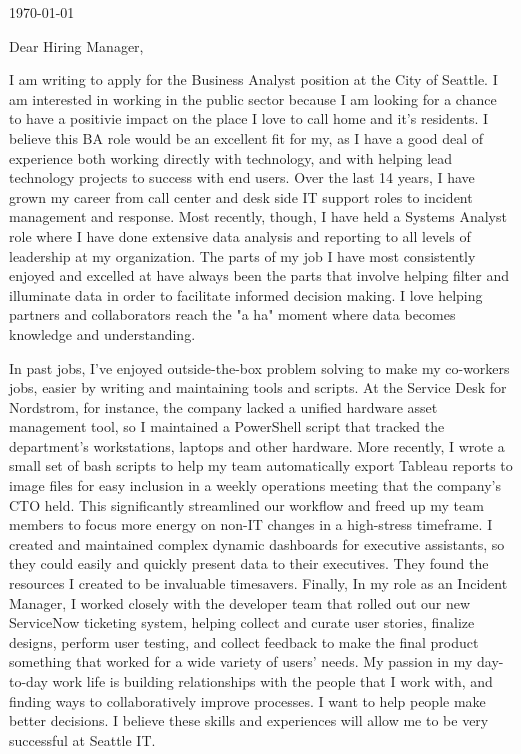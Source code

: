 \documentclass[10pt,oneside]{article}
\begin{document}
\hfill\dte\today
\heading
\vspace{\baselineskip}
\vspace{\baselineskip}

Dear Hiring Manager,

\vspace{\baselineskip}

I am writing to apply for the Business Analyst position at the City of Seattle. I am interested in working in the public sector because I am looking for a chance to have a positivie impact on the place I love to call home and it's residents. I believe this BA role would be an excellent fit for my, as I have a good deal of experience both working directly with technology, and with helping lead technology projects to success with end users. Over the last 14 years, I have grown my career from call center and desk side IT support roles to incident management and response. Most recently, though, I have held a Systems Analyst role where I have done extensive data analysis and reporting to all levels of leadership at my organization. The parts of my job I have most consistently enjoyed and excelled at have always been the parts that involve helping filter and illuminate data in order to facilitate informed decision making. I love helping partners and collaborators reach the "a ha" moment where data becomes knowledge and understanding.

\vspace{\baselineskip}

In past jobs, I’ve enjoyed outside-the-box problem solving to make my co-workers jobs, easier by writing and maintaining tools and scripts. At the Service Desk for Nordstrom, for instance, the company lacked a unified hardware asset management tool, so I maintained a PowerShell script that tracked the department’s workstations, laptops and other hardware. More recently, I wrote a small set of bash scripts to help my team automatically export Tableau reports to image files for easy inclusion in a weekly operations meeting that the company’s CTO held. This significantly streamlined our workflow and freed up my team members to focus more energy on non-IT changes in a high-stress timeframe. I created and maintained complex dynamic dashboards for executive assistants, so they could easily and quickly present data to their executives. They found the resources I created to be invaluable timesavers. Finally, In my role as an Incident Manager, I worked closely with the developer team that rolled out our new ServiceNow ticketing system, helping collect and curate user stories, finalize designs, perform user testing, and collect feedback to make the final product something that worked for a wide variety of users' needs.  My passion in my day-to-day work life is building relationships with the people that I work with, and finding ways to collaboratively improve processes. I want to help people make better decisions. I believe these skills and experiences will allow me to be very successful at Seattle IT.
\end{document}
